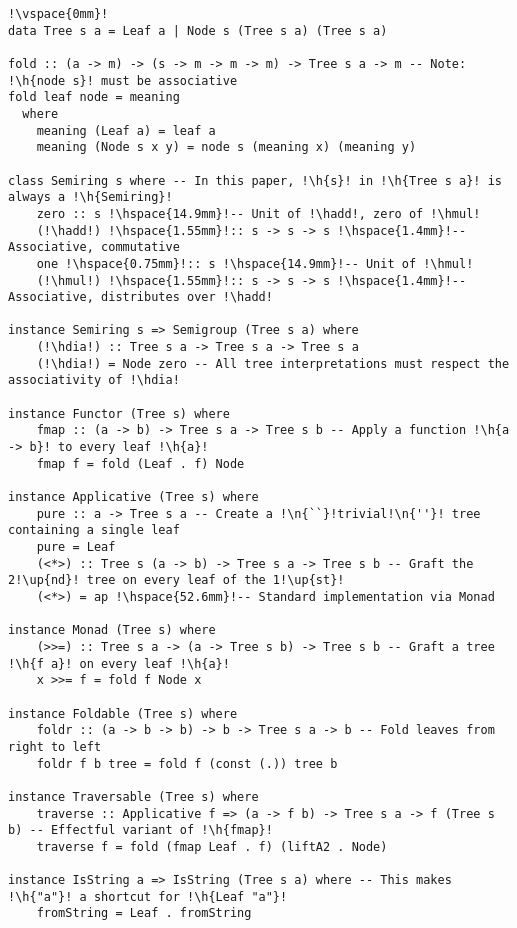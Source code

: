 \documentclass[crc,english]{programming}
\newcommand{\code}[1]{\lstinline[mathescape]|#1|}
\newcommand{\h}[1]{{\itshape\color{grayblue}#1}} %
\newcommand{\n}[1]{{\itshape\color{graygreen}#1}} %
\newcommand{\up}[1]{{\itshape\color{graygreen}\textsuperscript{#1}}}
\newcommand{\hadd}{{\large\color{darkblue} $\oplus$}}
\newcommand{\hmul}{{\large\color{darkblue} $\otimes$}}
\newcommand{\hdia}{\,\text{\raisebox{-0.2mm}{\Large\color{darkblue} $\diamond$}}\,}
\begin{document}
\begin{lstlisting}[float,label=lst-tree-std,xleftmargin=0pt,caption={
    The \code{Tree} data type and instances of various standard Haskell type classes.
},captionpos=t]
!\vspace{0mm}!
data Tree s a = Leaf a | Node s (Tree s a) (Tree s a)

fold :: (a -> m) -> (s -> m -> m -> m) -> Tree s a -> m -- Note: !\h{node s}! must be associative
fold leaf node = meaning
  where
    meaning (Leaf a) = leaf a
    meaning (Node s x y) = node s (meaning x) (meaning y)

class Semiring s where -- In this paper, !\h{s}! in !\h{Tree s a}! is always a !\h{Semiring}!
    zero :: s !\hspace{14.9mm}!-- Unit of !\hadd!, zero of !\hmul!
    (!\hadd!) !\hspace{1.55mm}!:: s -> s -> s !\hspace{1.4mm}!-- Associative, commutative
    one !\hspace{0.75mm}!:: s !\hspace{14.9mm}!-- Unit of !\hmul!
    (!\hmul!) !\hspace{1.55mm}!:: s -> s -> s !\hspace{1.4mm}!-- Associative, distributes over !\hadd!

instance Semiring s => Semigroup (Tree s a) where
    (!\hdia!) :: Tree s a -> Tree s a -> Tree s a
    (!\hdia!) = Node zero -- All tree interpretations must respect the associativity of !\hdia!

instance Functor (Tree s) where
    fmap :: (a -> b) -> Tree s a -> Tree s b -- Apply a function !\h{a -> b}! to every leaf !\h{a}!
    fmap f = fold (Leaf . f) Node

instance Applicative (Tree s) where
    pure :: a -> Tree s a -- Create a !\n{``}!trivial!\n{''}! tree containing a single leaf
    pure = Leaf
    (<*>) :: Tree s (a -> b) -> Tree s a -> Tree s b -- Graft the 2!\up{nd}! tree on every leaf of the 1!\up{st}!
    (<*>) = ap !\hspace{52.6mm}!-- Standard implementation via Monad

instance Monad (Tree s) where
    (>>=) :: Tree s a -> (a -> Tree s b) -> Tree s b -- Graft a tree !\h{f a}! on every leaf !\h{a}!
    x >>= f = fold f Node x

instance Foldable (Tree s) where
    foldr :: (a -> b -> b) -> b -> Tree s a -> b -- Fold leaves from right to left
    foldr f b tree = fold f (const (.)) tree b

instance Traversable (Tree s) where
    traverse :: Applicative f => (a -> f b) -> Tree s a -> f (Tree s b) -- Effectful variant of !\h{fmap}!
    traverse f = fold (fmap Leaf . f) (liftA2 . Node)

instance IsString a => IsString (Tree s a) where -- This makes !\h{"a"}! a shortcut for !\h{Leaf "a"}!
    fromString = Leaf . fromString
\end{lstlisting}
\end{document}
